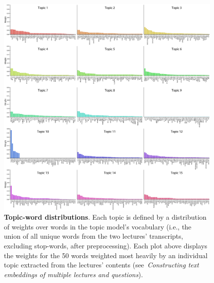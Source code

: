 \documentclass[10pt]{article}
\newcommand{\topicModelMethods}{\textit{Constructing text embeddings of multiple lectures and questions}}
\begin{document}
\begin{figure}[tp]
    \includegraphics[width=\textwidth]{figs/topic-word-distributions}

    \caption{\textbf{Topic-word distributions}. Each topic is defined by a distribution 
    of weights over words in the topic model's vocabulary (i.e., the union of all unique 
    words from the two lectures' transcripts, excluding stop-words, after 
    preprocessing). Each plot above displays the weights for the 50 words 
    weighted most heavily by an individual topic extracted from the lectures' contents 
    (see~\topicModelMethods).}

    \label{fig:topic-word-distributions}
\end{figure}
\end{document}
